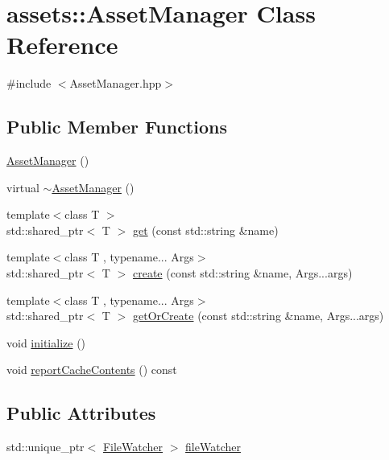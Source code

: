 \hypertarget{classassets_1_1AssetManager}{\section{assets\-:\-:Asset\-Manager Class Reference}
\label{classassets_1_1AssetManager}
}


{\ttfamily \#include $<$Asset\-Manager.\-hpp$>$}

\subsection*{Public Member Functions}
\begin{DoxyCompactItemize}
\item 
\hyperlink{classassets_1_1AssetManager_a8b5705260aeff44a6fec0bbb6178050b}{Asset\-Manager} ()
\item 
virtual \hyperlink{classassets_1_1AssetManager_a9f6d3724f9eac263999bbbb20b6696e7}{$\sim$\-Asset\-Manager} ()
\item 
{\footnotesize template$<$class T $>$ }\\std\-::shared\-\_\-ptr$<$ T $>$ \hyperlink{classassets_1_1AssetManager_af96a7ccb3edec25db7450bec190e63dc}{get} (const std\-::string \&name)
\item 
{\footnotesize template$<$class T , typename... Args$>$ }\\std\-::shared\-\_\-ptr$<$ T $>$ \hyperlink{classassets_1_1AssetManager_ab0bd2be0dbec9314072e215276988f74}{create} (const std\-::string \&name, Args...\-args)
\item 
{\footnotesize template$<$class T , typename... Args$>$ }\\std\-::shared\-\_\-ptr$<$ T $>$ \hyperlink{classassets_1_1AssetManager_a273c9ca724ac27e88b51042b537fbde4}{get\-Or\-Create} (const std\-::string \&name, Args...\-args)
\item 
void \hyperlink{classassets_1_1AssetManager_a097eaa105c31e94bf2197cf28782a59b}{initialize} ()
\item 
void \hyperlink{classassets_1_1AssetManager_ae1993b46c62757b98dd73e7cc8551d1a}{report\-Cache\-Contents} () const 
\end{DoxyCompactItemize}
\subsection*{Public Attributes}
\begin{DoxyCompactItemize}
\item 
std\-::unique\-\_\-ptr$<$ \hyperlink{classassets_1_1FileWatcher}{File\-Watcher} $>$ \hyperlink{classassets_1_1AssetManager_a77d103eec72f000b81bee460a1f36b7b}{file\-Watcher}
\end{DoxyCompactItemize}


